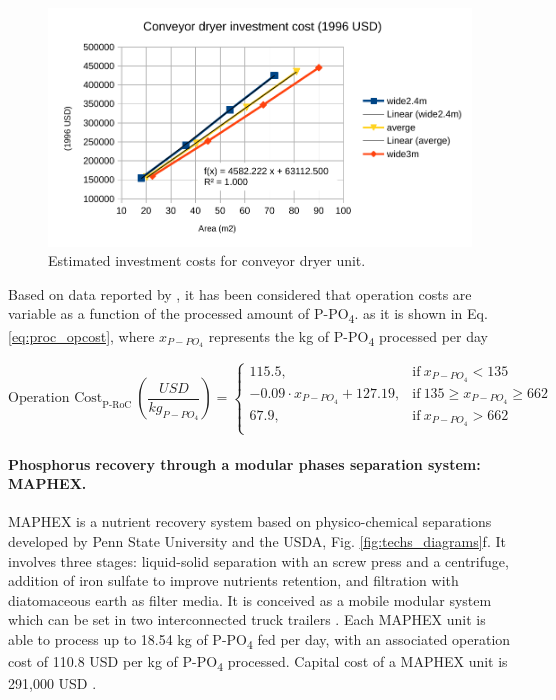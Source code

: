 \begin{refsection}[referencesCh4]
\begin{figure}[h]
	\centering
	\includegraphics[width=0.8\linewidth]{gfx/AppendixC/converyor_dryer_investment_cost} 
	\caption{Estimated investment costs for conveyor dryer unit.}
	\label{fig:converyor_dryer_investment_cost}
\end{figure}

Based on data reported by \citet{egle_phosphorus_2016}, it has been considered that operation costs are variable as a function of the processed amount of P-PO\textsubscript{4}. as it is shown in Eq. \ref{eq:proc_opcost}, where $x_{P-PO_{4}}$ represents the kg of P-PO\textsubscript{4} processed per day

\begin{equation}
\text{Operation Cost}_{\text{P-RoC}} \ \left(\frac{USD}{kg_{P-PO_{4}}}\right)=
\begin{cases}
115.5, & \text{if}\ x_{P-PO_{4}} < 135 \\
-0.09 \cdot x_{P-PO_{4}} +127.19, & \text{if} \ 135 \geq x_{P-PO_{4}} \geq 662 \\
67.9, & \text{if} \ x_{P-PO_{4}} > 662 \\
\end{cases} \label{eq:proc_opcost}
\end{equation}

\paragraph{Phosphorus recovery through a modular phases separation system: MAPHEX.}
MAPHEX is a nutrient recovery system based on physico-chemical separations developed by Penn State University and the USDA, Fig. \ref{fig:techs_diagrams}f. It involves three stages: liquid-solid separation with an screw press and a centrifuge, addition of iron sulfate to improve nutrients retention, and filtration with diatomaceous earth as filter media. It is conceived as a mobile modular system which can be set in two interconnected truck trailers \citep{church_novel_2016, church_versatility_2018}.
Each MAPHEX unit is able to process up to 18.54 kg of P-PO\textsubscript{4} fed per day, with an associated operation cost of 110.8 USD per kg of P-PO\textsubscript{4} processed. Capital cost of a MAPHEX unit is 291,000 USD \citep{church_novel_2016, church_versatility_2018}.


\end{refsection}
